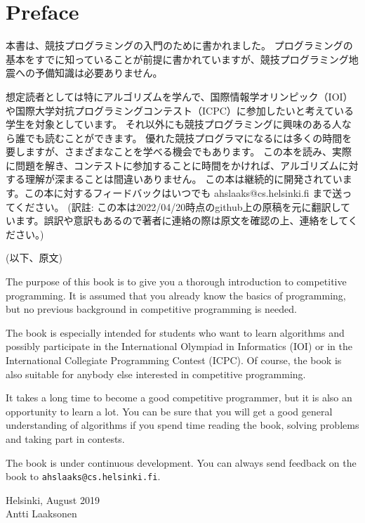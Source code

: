 \chapter*{Preface}

本書は、競技プログラミングの入門のために書かれました。
プログラミングの基本をすでに知っていることが前提に書かれていますが、競技プログラミング地震への予備知識は必要ありません。

想定読者としては特にアルゴリズムを学んで、国際情報学オリンピック（IOI）や国際大学対抗プログラミングコンテスト（ICPC）に参加したいと考えている学生を対象としています。
それ以外にも競技プログラミングに興味のある人なら誰でも読むことができます。
優れた競技プログラマになるには多くの時間を要しますが、さまざまなことを学べる機会でもあります。
この本を読み、実際に問題を解き、コンテストに参加することに時間をかければ、アルゴリズムに対する理解が深まることは間違いありません。
この本は継続的に開発されています。この本に対するフィードバックはいつでも ahslaaks@cs.helsinki.fi まで送ってください。
(訳註: この本は2022/04/20時点のgithub上の原稿を元に翻訳しています。誤訳や意訳もあるので著者に連絡の際は原文を確認の上、連絡をしてください。)

(以下、原文)

The purpose of this book is to give you
a thorough introduction to competitive programming.
It is assumed that you already
know the basics of programming, but no previous
background in competitive programming is needed.

The book is especially intended for
students who want to learn algorithms and
possibly participate in
the International Olympiad in Informatics (IOI) or
in the International Collegiate Programming Contest (ICPC).
Of course, the book is also suitable for
anybody else interested in competitive programming.

It takes a long time to become a good competitive
programmer, but it is also an opportunity to learn a lot.
You can be sure that you will get
a good general understanding of algorithms
if you spend time reading the book,
solving problems and taking part in contests.

The book is under continuous development.
You can always send feedback on the book to
\texttt{ahslaaks@cs.helsinki.fi}.

\begin{flushright}
Helsinki, August 2019 \\
Antti Laaksonen
\end{flushright}
